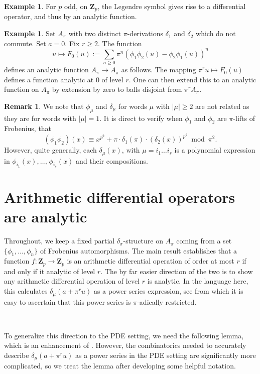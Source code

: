 \documentclass[10pt]{amsart}
\theoremstyle{Theorem}
\theoremstyle{definition}
\newtheorem{xmp}[thm]{Example}
\newtheorem{rmk}[thm]{Remark}
\newcommand{\ZZ}{\mathbf Z}
\renewcommand{\d}{\delta}
\begin{document}
\begin{xmp}
For $p$ odd, on $\ZZ_p$, the Legendre symbol gives rise to a differential operator, and thus by \cite{BRS11} an analytic function. 
\end{xmp}

\begin{xmp}
Set $A_\pi$ with two distinct $\pi$-derivations $\d_1$ and $\d_2$ which do not commute. Set $a = 0$. Fix $r \geq 2$. The function $$u \mapsto F_0(u) := \sum_{n \geq 0} \pi^{n}(\phi_1 \phi_2(u) - \phi_2 \phi_1 (u))^n$$ defines an analytic function $A_\pi \to A_\pi$ as follows. The mapping $\pi^r u \mapsto F_0(u)$ defines a function analytic at $0$ of level $r$. One can then extend this to an analytic function on $A_\pi$ by extension by zero to balls disjoint from $\pi^r A_\pi$. 
\end{xmp}

\begin{rmk}\label{rmk:expansion}
We note that $\phi_\mu$ and $\delta_\mu$ for words $\mu$ with $|\mu| \geq 2$ are not related as they are for words with $|\mu| = 1$. It is direct to verify when $\phi_1$ and $\phi_2$ are $\pi$-lifts of Frobenius, that 
$$(\phi_1 \phi_2)(x) \equiv x^{p^2} + \pi \cdot \d_1 (\pi) \cdot (\d_2 (x))^{p^2} \bmod \pi^2.$$ However, quite generally, each $\d_\mu(x)$, with $\mu = i_1 \ldots i_s$ is a polynomial expression in $\phi_{i_1}(x), \ldots, \phi_{i_s}(x)$ and their compositions. 
\end{rmk}


\section{Arithmetic differential operators are analytic} Throughout, we keep a fixed partial $\delta_{\pi}$-structure on $A_\pi$ coming from a set $\{ \phi_1,\ldots,\phi_n\}$ of Frobenius automorphisms. The main result \cite[Thm. 4, 5]{BRS11} establishes that a function $f \colon \ZZ_p \to \ZZ_p$ is an arithmetic differential operation of order at most $r$ if and only if it analytic of level $r$. The by far easier direction of the two is to show any arithmetic differential operation of level $r$ is analytic. In the language here, this calculates $\d_\mu(a+\pi^r u)$ as a power series expression, see \cite[Lem. 10]{BRS11} from which it is easy to ascertain that this power series is $\pi$-adically restricted. 

\

To generalize this direction to the PDE setting, we need the following lemma, which is an enhancement of \cite[Lem. 10]{BRS11}. However, the combinatorics needed to accurately describe $\d_\mu(a + \pi^r u)$ as a power series in the PDE setting are significantly more complicated, so we treat the lemma after developing some helpful notation. 
\end{document}
